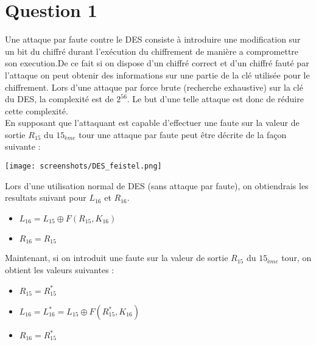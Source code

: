 \documentclass[a4paper,11pt]{article}
\title{\vspace{13em}{\huge Calcul sécurisé - Contrôle continu}}
\begin{document}
	
	\clearpage
	\maketitle\vspace{13em}
	\newpage
	\tableofcontents
	\newpage\clearpage{}
	
	\section{Question 1}
	Une attaque par faute contre le DES consiste à introduire une modification sur un bit du chiffré durant l'exécution du chiffrement de manière a compromettre son execution.De ce fait si on dispose d'un chiffré correct et d'un chiffré fauté par l'attaque on peut obtenir des informations sur une partie de  la clé utilisée pour le chiffrement.
	Lors d'une attaque par force brute (recherche exhaustive) sur la clé du DES, la complexité est de $2^{56}$. Le but d'une telle attaque est donc de réduire cette complexité.\\

	En supposant que l'attaquant est capable d'effectuer une faute sur la valeur de sortie $R_{15}$ du $15_{ème}$ tour une attaque par faute peut être décrite de la façon suivante :\\
	
	
	\begin{center}\texttt{[image: screenshots/DES\_feistel.png]}\end{center}
	
	Lors d'une utilisation normal de DES (sans attaque par faute), on obtiendrais les resultats suivant pour $L_{16}$ et $R_{16}$.\\
	\begin{itemize}
		\item $L_{16} = L_{15} \oplus F(R_{15}, K_{16})$
		\item $R_{16} = R_{15}$
	\end{itemize}
	 
	Maintenant, si on introduit une faute sur la valeur de sortie $R_{15}$ du $15_{ème}$ tour, on obtient les valeurs suivantes :\\
	\begin{itemize}
		\item $R_{15} = R_{15}^{*}$ 
		\item $L_{16} = L_{16}^{*} = L_{15} \oplus F(R_{15}^{*}, K_{16})$
		\item $	R_{16} = R_{15}^{*}$
	\end{itemize}
	
\end{document}
